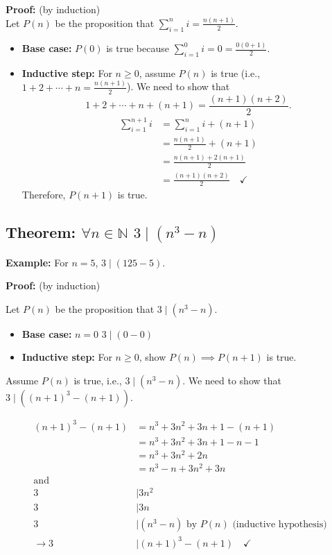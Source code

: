 \documentclass[11pt]{article}
\begin{document}
\textbf{Proof:} (by induction)\\
Let \( P(n) \) be the proposition that \( \sum_{i=1}^{n} i = \frac{n(n+1)}{2} \).
\begin{itemize}
    \item \textbf{Base case:} \( P(0) \) is true because \( \sum_{i=1}^{0} i = 0 = \frac{0(0+1)}{2} \).
    \item \textbf{Inductive step:} For \( n \geq 0 \), assume \( P(n) \) is true (i.e., \( 1 + 2 + \cdots + n = \frac{n(n+1)}{2} \)). We need to show that
    \[
    1+2+\cdots+n+(n+1) = \frac{(n+1)(n+2)}{2}.
    \]
    \begin{align*}
        \sum_{i=1}^{n+1} i &= \sum_{i=1}^{n} i + (n+1) \\
        &= \frac{n(n+1)}{2} + (n+1) \\
        &= \frac{n(n+1) + 2(n+1)}{2} \\
        &= \frac{(n+1)(n+2)}{2} \quad \checkmark
    \end{align*}
    Therefore, \( P(n+1) \) is true.
\end{itemize}

\subsection*{Theorem: \( \forall n \in \mathbb{N} \) \hspace{1cm} \( 3 \mid (n^3 - n) \)}
\textbf{Example:} For \( n = 5 \), \( 3 \mid (125 - 5) \).

\textbf{Proof:} (by induction)

Let \( P(n) \) be the proposition that \( 3 \mid (n^3 - n) \).

\begin{itemize}
    \item \textbf{Base case:} \( n = 0 \) \hspace{1cm} \(3 \mid (0-0) \)  \quad \checkmark
    \item \textbf{Inductive step:} For \(n \geq 0\), show \(P(n) \implies P(n+1)\) is true.
\end{itemize}


Assume \( P(n) \) is true, i.e., \( 3 \mid (n^3 - n) \). We need to show that \( 3 \mid ((n+1)^3 - (n+1)) \).

\begin{align*}
    (n+1)^3 - (n+1) &= n^3 + 3n^2 + 3n + 1 - (n + 1) \\
    &= n^3 + 3n^2 + 3n + 1 - n - 1 \\
    &= n^3 + 3n^2 + 2n \\
    &= n^3 - n + 3n^2 + 3n \\
    \text{and} \\
    3 &\mid 3n^2 \\
    3 &\mid 3n \\
    3 &\mid (n^3 - n) \text{ by } P(n) \text{ (inductive hypothesis)} \\
    \rightarrow 3 &\mid (n+1)^3 - (n+1) \quad \checkmark
\end{align*}
\end{document}
